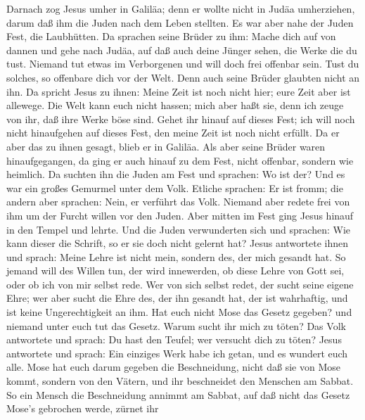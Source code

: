  Darnach zog Jesus umher in Galiläa; denn er wollte nicht in
Judäa umherziehen, darum daß ihm die Juden nach dem Leben stellten.
 Es war aber nahe der Juden Fest, die Laubhütten.
 Da sprachen seine Brüder zu ihm: Mache dich auf von dannen
und gehe nach Judäa, auf daß auch deine Jünger sehen, die Werke die du
tust.  Niemand tut etwas im Verborgenen und will doch frei
offenbar sein. Tust du solches, so offenbare dich vor der Welt.
 Denn auch seine Brüder glaubten nicht an ihn. 
Da spricht Jesus zu ihnen: Meine Zeit ist noch nicht hier; eure Zeit
aber ist allewege.  Die Welt kann euch nicht hassen; mich
aber haßt sie, denn ich zeuge von ihr, daß ihre Werke böse sind.
 Gehet ihr hinauf auf dieses Fest; ich will noch nicht
hinaufgehen auf dieses Fest, den meine Zeit ist noch nicht erfüllt.
 Da er aber das zu ihnen gesagt, blieb er in Galiläa.
 Als aber seine Brüder waren hinaufgegangen, da ging er
auch hinauf zu dem Fest, nicht offenbar, sondern wie heimlich.
 Da suchten ihn die Juden am Fest und sprachen: Wo ist der?
 Und es war ein großes Gemurmel unter dem Volk. Etliche
sprachen: Er ist fromm; die andern aber sprachen: Nein, er verführt das
Volk.  Niemand aber redete frei von ihm um der Furcht
willen vor den Juden.  Aber mitten im Fest ging Jesus
hinauf in den Tempel und lehrte.  Und die Juden
verwunderten sich und sprachen: Wie kann dieser die Schrift, so er sie
doch nicht gelernt hat?  Jesus antwortete ihnen und sprach:
Meine Lehre ist nicht mein, sondern des, der mich gesandt hat.
 So jemand will des Willen tun, der wird innewerden, ob
diese Lehre von Gott sei, oder ob ich von mir selbst rede. 
Wer von sich selbst redet, der sucht seine eigene Ehre; wer aber sucht
die Ehre des, der ihn gesandt hat, der ist wahrhaftig, und ist keine
Ungerechtigkeit an ihm.  Hat euch nicht Mose das Gesetz
gegeben? und niemand unter euch tut das Gesetz. Warum sucht ihr mich zu
töten?  Das Volk antwortete und sprach: Du hast den Teufel;
wer versucht dich zu töten?  Jesus antwortete und sprach:
Ein einziges Werk habe ich getan, und es wundert euch alle.
 Mose hat euch darum gegeben die Beschneidung, nicht daß
sie von Mose kommt, sondern von den Vätern, und ihr beschneidet den
Menschen am Sabbat.  So ein Mensch die Beschneidung annimmt
am Sabbat, auf daß nicht das Gesetz Mose's gebrochen werde, zürnet ihr
